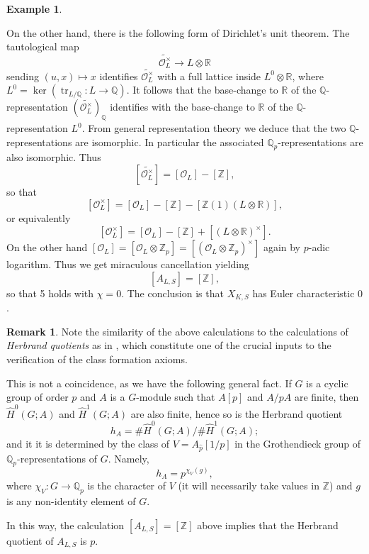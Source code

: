 \documentclass[12pt]{article}
\theoremstyle{definition}
\newtheorem{example}[theorem]{Example}
\newtheorem{remark}[theorem]{Remark}
\newcommand{\on}{\operatorname}
\newcommand{\mc}{\mathcal}
\newcommand{\mbb}{\mathbb}
\newcommand{\wh}{\widehat}
\begin{document}
\begin{example}
\begin{enumerate}
On the other hand, there is the following form of Dirichlet's unit theorem.  The tautological map
$$\widetilde{\mc{O}_L^\times} \to L\otimes \mbb{R}$$
sending $(u,x) \mapsto x$ identifies $\widetilde{\mc{O}_L^
\times}$ with a full lattice inside $L^0\otimes\mbb{R}$, where $L^0=\on{ker}(\on{tr}_{L/\mbb{Q}}:L\to\mbb{Q})$.  It follows that the base-change to $\mbb{R}$ of the $\mbb{Q}$-representation $(\widetilde{\mc{O}_L^\times})_{\mbb{Q}}$ identifies with the base-change to $\mbb{R}$ of the $\mbb{Q}$-representation $L^0$.  From general representation theory we deduce that the two $\mbb{Q}$-representations are isomorphic. In particular the associated $\mbb{Q}_p$-representations are also isomorphic.  Thus 
$$[\widetilde{\mc{O}_L^\times}] = [\mc{O}_L]-[\mbb{Z}],$$
so that
$$[\mc{O}_L^\times] = [\mc{O}_L] - [\mbb{Z}] - [\mbb{Z}(1)(L\otimes\mbb{R})],$$
or equivalently
$$[\mc{O}_L^\times] = [\mc{O}_L] - [\mbb{Z}] + [(L\otimes\mbb{R})^\times].$$
On the other hand $[\mc{O}_L] = [\mc{O}_L\otimes\mbb{Z}_p] = [(\mc{O}_L\otimes\mbb{Z}_p)^\times]$ again by $p$-adic logarithm.  Thus we get miraculous cancellation yielding
$$[A_{L,S}] = [\mbb{Z}],$$
so that 5 holds with $\chi=0$.  The conclusion is that $X_{K,S}$ has Euler characteristic $0$.
\end{enumerate}
\end{example}

\begin{remark}
Note the similarity of the above calculations to the calculations of \emph{Herbrand quotients} as in \cite{artintate}, which constitute one of the crucial inputs to the verification of the class formation axioms.

This is not a coincidence, as we have the following general fact.  If $G$ is a cyclic group of order $p$ and $A$ is a $G$-module such that $A[p]$ and $A/pA$ are finite, then $\wh{H}^0(G;A)$ and $\wh{H}^{1}(G;A)$ are also finite, hence so is the Herbrand quotient
$$h_A=\# \wh{H}^0(G;A)/ \# \wh{H}^{1}(G;A);$$
and it it is determined by the class of $V=A_{\wh{p}}[1/p]$ in the Grothendieck group of $\mbb{Q}_p$-representations of $G$. Namely,
$$h_A = p^{\chi_V(g)},$$
where $\chi_V:G\to\mbb{Q}_p$ is the character of $V$ (it will necessarily take values in $\mbb{Z}$) and $g$ is any non-identity element of $G$.

In this way, the calculation $[A_{L,S}]=[\mbb{Z}]$ above implies that the Herbrand quotient of $A_{L,S}$ is $p$.
\end{remark}
\end{document}
